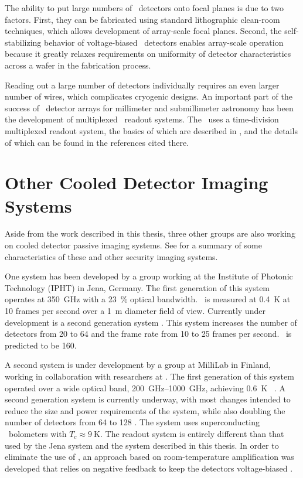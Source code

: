 The ability to put large numbers of \TES\ detectors onto focal planes is due to two factors.
First, they can be fabricated using standard lithographic clean-room techniques, which allows development of array-scale focal planes.
Second, the self-stabilizing behavior of voltage-biased \TES\ detectors enables array-scale operation because it greatly relaxes requirements on uniformity of detector characteristics across a wafer in the fabrication process.

Reading out a large number of detectors individually requires an even larger number of wires, which complicates cryogenic designs.
An important part of the success of \TES\ detector arrays for millimeter and submillimeter astronomy has been the development of multiplexed \SQUID\ readout systems.
The \Imager\ uses a time-division multiplexed readout system, the basics of which are described in , and the details of which can be found in the references cited there.
 

\section{Other Cooled Detector Imaging Systems}

Aside from the work described in this thesis, three other groups are also working on cooled detector passive imaging systems.
See  for a summary of some characteristics of these and other security imaging systems.

One system has been developed by a group working at the Institute of Photonic Technology (IPHT) in Jena, Germany.
The first generation of this system \cite{heinz_toward_2011} operates at \SI{350}{\GHz} with a \SI{23}{\percent} optical bandwidth.
\NETD\ is measured at \SI{0.4}{\K} at 10 frames per second over a \SI{1}{\m} diameter field of view.
Currently under development is a second generation system \cite{heinz_development_2013,may_next_2013}.
This system increases the number of detectors from 20 to 64 and the frame rate from 10 to 25 frames per second.
\NETD\ is predicted to be \SI{160}{\mK}.

A second system is under development by a group at MilliLab in Finland, working in collaboration with researchers at \NIST.
The first generation of this system operated over a wide optical band, \SIrange{200}{1000}{\GHz}, achieving \SI{0.6}{\K} \NETD\ \cite{grossman_passive_2010}.
A second generation system is currently underway, with most changes intended to reduce the size and power requirements of the system, while also doubling the number of detectors from 64 to 128 \cite{luukanen_applications_2012}.
The system uses superconducting \TES\ bolometers with $T_c \approx \SI{9}{\K}$.
The readout system is entirely different than that used by the Jena system and the system described in this thesis.
In order to eliminate the use of \SQUIDs, an approach based on room-temperature amplification was developed that relies on negative feedback to keep the detectors voltage-biased \cite{penttila_low-noise_2006}.

